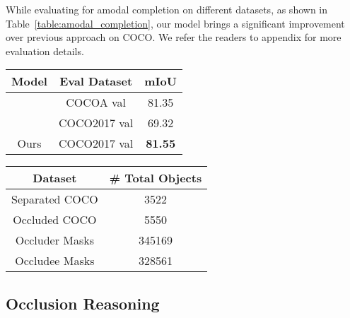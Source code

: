 \documentclass{bmvc2k}
\begin{document}
While evaluating for amodal completion on different datasets, 
as shown in Table~\ref{table:amodal_completion}, 
our model brings a significant improvement over previous approach on COCO.
We refer the readers to appendix for more evaluation details.

\hspace{-0.3cm}
\begin{minipage}[t]{0.5\textwidth}
\setlength{\tabcolsep}{8pt}
\centering
\footnotesize
\begin{tabular}{c|c|c}
Model & Eval Dataset & mIoU   \\ \toprule 
~\cite{zhan2020self} & COCOA val &	81.35  \\ 
~\cite{zhan2020self} & COCO2017 val &	69.32  \\ 
Ours & COCO2017 val &	\textbf{81.55} \\ \bottomrule
\end{tabular}
\label{table:amodal_completion}
\end{minipage}
\hspace{-0.6cm}
\begin{minipage}[t]{0.5\textwidth}
\setlength{\tabcolsep}{8pt}
\footnotesize
\centering
\begin{tabular}{c|c}
Dataset & \# Total Objects   \\ \toprule 
Separated COCO  &  3522  \\ 
Occluded COCO   &  5550  \\ 
Occluder Masks  &  345169  \\ 
Occludee Masks  &  328561  \\ \bottomrule
\end{tabular}
\label{table:statistics_dataset}
\end{minipage}

\vspace{-0.4cm}
\subsection{Occlusion Reasoning}
\label{sec:occlusion_reasoning}
\vspace{-0.1cm}
\end{document}
